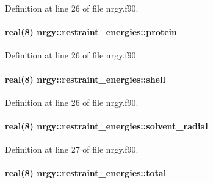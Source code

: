 Definition at line 26 of file nrgy.\-f90.

\hypertarget{structnrgy_1_1restraint__energies_ae289d7647d6a3e96fd5520432b10e0ce}{
\paragraph[{protein}]{\setlength{\rightskip}{0pt plus 5cm}real(8) nrgy\-::restraint\-\_\-energies\-::protein}}\label{structnrgy_1_1restraint__energies_ae289d7647d6a3e96fd5520432b10e0ce}


Definition at line 26 of file nrgy.\-f90.

\hypertarget{structnrgy_1_1restraint__energies_a808979c4a706d6f6a4229b230891e5cf}{
\paragraph[{shell}]{\setlength{\rightskip}{0pt plus 5cm}real(8) nrgy\-::restraint\-\_\-energies\-::shell}}\label{structnrgy_1_1restraint__energies_a808979c4a706d6f6a4229b230891e5cf}


Definition at line 26 of file nrgy.\-f90.

\hypertarget{structnrgy_1_1restraint__energies_a0fbe401d1ec0a9d53fb42075e1e57e7a}{
\paragraph[{solvent\-\_\-radial}]{\setlength{\rightskip}{0pt plus 5cm}real(8) nrgy\-::restraint\-\_\-energies\-::solvent\-\_\-radial}}\label{structnrgy_1_1restraint__energies_a0fbe401d1ec0a9d53fb42075e1e57e7a}


Definition at line 27 of file nrgy.\-f90.

\hypertarget{structnrgy_1_1restraint__energies_ab5d7a01468f8c07bf7696c5b1e9ad994}{
\paragraph[{total}]{\setlength{\rightskip}{0pt plus 5cm}real(8) nrgy\-::restraint\-\_\-energies\-::total}}\label{structnrgy_1_1restraint__energies_ab5d7a01468f8c07bf7696c5b1e9ad994}


